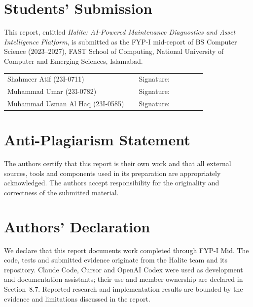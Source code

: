 \pagestyle{frontmatter}
\setcounter{page}{1}

\chapter*{Students' Submission}

This report, entitled \emph{Halite: AI-Powered Maintenance Diagnostics and Asset Intelligence Platform}, is submitted as the FYP-I mid-report of BS Computer Science (2023--2027), FAST School of Computing, National University of Computer and Emerging Sciences, Islamabad.

\vspace{1.5em}
\begin{tabular}{@{}p{0.62\linewidth}p{0.32\linewidth}@{}}
Shahmeer Atif (23I-0711) & Signature: \hrulefill \\[1.6em]
Muhammad Umar (23I-0782) & Signature: \hrulefill \\[1.6em]
Muhammad Usman Al Haq (23I-0585) & Signature: \hrulefill \\
\end{tabular}

\clearpage
\chapter*{Anti-Plagiarism Statement}

The authors certify that this report is their own work and that all external sources, tools and components used in its preparation are appropriately acknowledged. The authors accept responsibility for the originality and correctness of the submitted material.

\clearpage
\chapter*{Authors' Declaration}

We declare that this report documents work completed through FYP-I Mid. The code, tests and submitted evidence originate from the Halite team and its repository. Claude Code, Cursor and OpenAI Codex were used as development and documentation assistants; their use and member ownership are declared in Section~8.7. Reported research and implementation results are bounded by the evidence and limitations discussed in the report.

